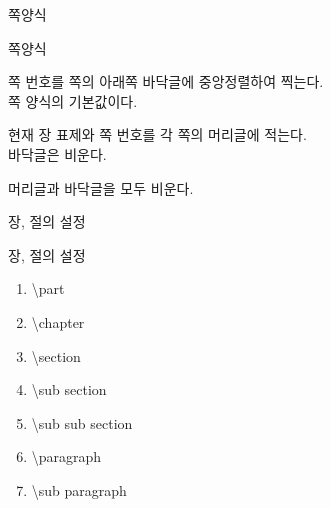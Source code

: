 \documentclass[ aspectratio=149,  10pt,blue,xcolor=pdftex,dvipsnames,table,handout,notes]{beamer}
\begin{document}
		\begin{frame}[t]{쪽양식}

			\begin{block} {쪽양식}
			\begin{description}[1234567890]
			\item [\textbf{plain}] 쪽 번호를 쪽의 아래쪽 바닥글에 중앙정렬하여 찍는다.\\
								쪽 양식의 기본값이다.
			\item [\textbf{headings}] 현재 장 표제와 쪽 번호를 각 쪽의 머리글에 적는다.\\
								바닥글은 비운다.
			\item [\textbf{empty}] 머리글과 바닥글을 모두 비운다.
			\end{description}
			\end{block}

		\note[item]{}
		\end{frame}


		\begin{frame}[t]{장, 절의 설정}

			\begin{block} {장, 절의 설정}
			\begin{enumerate}
			\item	\textbackslash part
			\item	\textbackslash chapter
			\item	\textbackslash section
			\item	\textbackslash sub section
			\item	\textbackslash sub sub section
			\item	\textbackslash paragraph
			\item	\textbackslash sub paragraph
			\end{enumerate}
			\end{block}

		\note[item]{}
		\end{frame}
\end{document}
